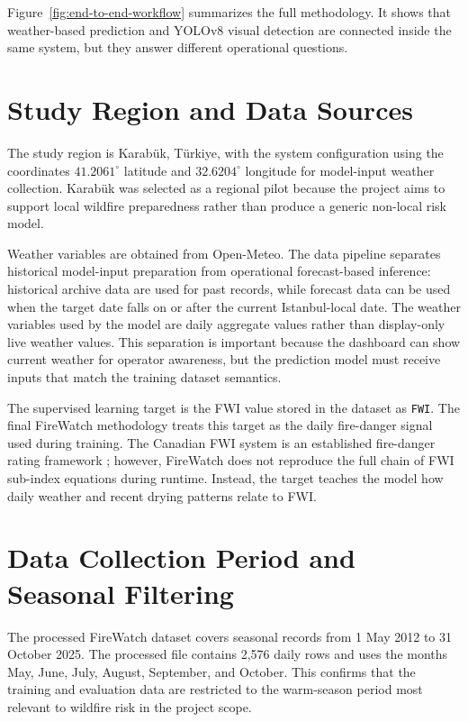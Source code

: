 Figure~\ref{fig:end-to-end-workflow} summarizes the full methodology. It
shows that weather-based prediction and YOLOv8 visual detection are connected
inside the same system, but they answer different operational questions.

\section{Study Region and Data Sources}

The study region is Karabük, Türkiye, with the system configuration using the
coordinates \(41.2061^\circ\) latitude and \(32.6204^\circ\) longitude for
model-input weather collection. Karabük was selected as a regional pilot
because the project aims to support local wildfire preparedness rather than
produce a generic non-local risk model.

Weather variables are obtained from Open-Meteo. The data pipeline separates
historical model-input preparation from operational forecast-based inference:
historical archive data are used for past records, while forecast data can be
used when the target date falls on or after the current Istanbul-local date.
The weather variables used by the model are daily aggregate values rather than
display-only live weather values. This separation is important because the
dashboard can show current weather for operator awareness, but the prediction
model must receive inputs that match the training dataset semantics.

The supervised learning target is the FWI value stored in the dataset as
\texttt{FWI}. The final FireWatch methodology treats this target as the daily
fire-danger signal used during training. The Canadian FWI system is an
established fire-danger rating framework \cite{stocks1989}; however, FireWatch
does not reproduce the full chain of FWI sub-index equations during runtime.
Instead, the target teaches the model how daily weather and recent drying
patterns relate to FWI.

\section{Data Collection Period and Seasonal Filtering}

The processed FireWatch dataset covers seasonal records from 1 May 2012 to
31 October 2025. The processed file contains 2,576 daily rows and
uses the months May, June, July, August, September, and October. This confirms
that the training and evaluation data are restricted to the warm-season period
most relevant to wildfire risk in the project scope.

